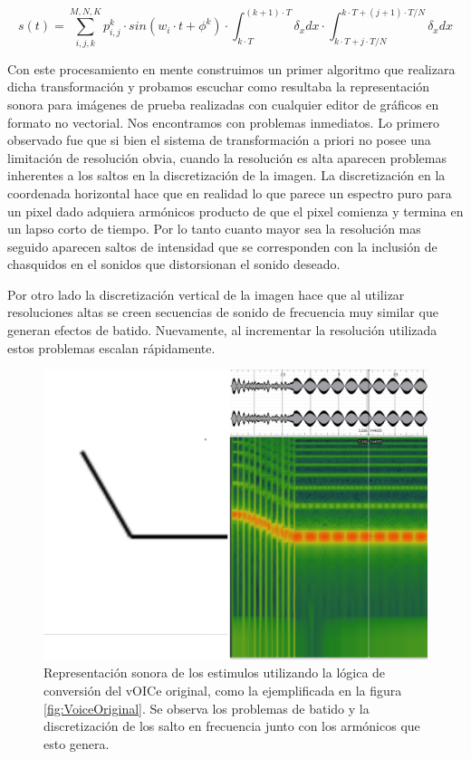 \documentclass{article}
\begin{document}
    \begin{equation}
        \label{ec:VoiceOriginal}
        s(t) = \sum_{i,j,k}^{M,N,K} p_{i,j}^k \cdot sin(w_i \cdot t + \phi^k) \cdot \int_{k \cdot T}^{(k+1) \cdot T} \delta_x dx \cdot \int_{k \cdot T+j \cdot T/N}^{k \cdot T + (j+1) \cdot T/N} \delta_x dx
    \end{equation}

    Con este procesamiento en mente construimos un primer algoritmo que realizara dicha transformación y probamos escuchar como resultaba la representación sonora para imágenes de prueba realizadas con cualquier editor de gráficos en formato no vectorial. Nos encontramos con problemas inmediatos. Lo primero observado fue que si bien el sistema de transformación a priori no posee una limitación de resolución obvia, cuando la resolución es alta aparecen problemas inherentes a los saltos en la discretización de la imagen. La discretización en la coordenada horizontal hace que en realidad lo que parece un espectro puro para un pixel dado adquiera armónicos producto de que el pixel comienza y termina en un lapso corto de tiempo. Por lo tanto cuanto mayor sea la resolución mas seguido aparecen saltos de intensidad que se corresponden con la inclusión de chasquidos en el sonidos que distorsionan el sonido deseado. 
    
    Por otro lado la discretización vertical de la imagen hace que al utilizar resoluciones altas se creen secuencias de sonido de frecuencia muy similar que generan efectos de batido. Nuevamente, al incrementar la resolución utilizada estos problemas escalan rápidamente. 
    
    
    \begin{figure}
        \center
        \includegraphics[width=\textwidth]{Imagenes/vOICeOriginal.png}
        \caption{Representación sonora de los estimulos utilizando la lógica de conversión del vOICe original, como la ejemplificada en la figura \ref{fig:VoiceOriginal}. Se observa los problemas de batido y la discretización de los salto en frecuencia junto con los armónicos que esto genera.}
        \label{fig:vOICeOriginal}
    \end{figure}
    
\end{document}
